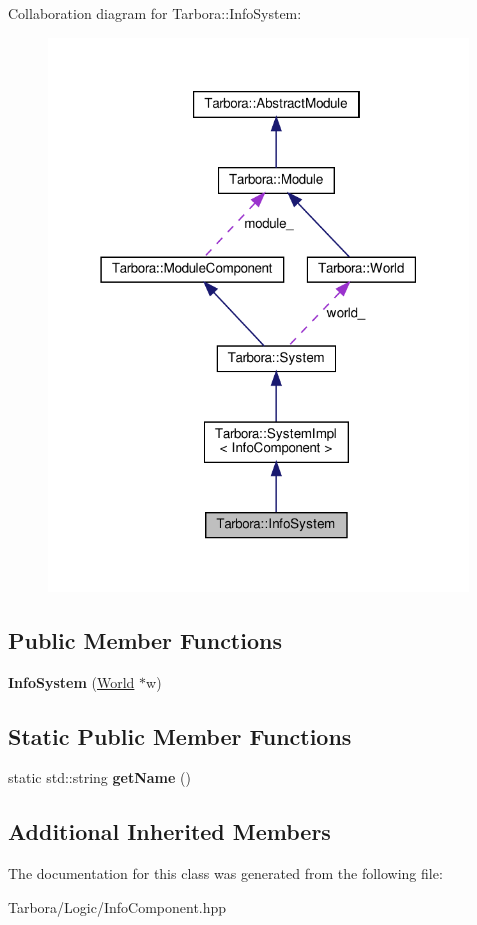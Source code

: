 Collaboration diagram for Tarbora\+:\+:Info\+System\+:\nopagebreak
\begin{figure}[H]
\begin{center}
\leavevmode
\includegraphics[width=316pt]{classTarbora_1_1InfoSystem__coll__graph}
\end{center}
\end{figure}
\subsection*{Public Member Functions}
\begin{DoxyCompactItemize}
\item 
\mbox{\label{classTarbora_1_1InfoSystem_aa51ed7d2c8080dcaec3ab3f885bb20da}} 
{\bfseries Info\+System} (\hyperlink{classTarbora_1_1World}{World} $\ast$w)
\end{DoxyCompactItemize}
\subsection*{Static Public Member Functions}
\begin{DoxyCompactItemize}
\item 
\mbox{\label{classTarbora_1_1InfoSystem_a12d888ad9d36d89e2d54b25540a6dbae}} 
static std\+::string {\bfseries get\+Name} ()
\end{DoxyCompactItemize}
\subsection*{Additional Inherited Members}


The documentation for this class was generated from the following file\+:\begin{DoxyCompactItemize}
\item 
Tarbora/\+Logic/Info\+Component.\+hpp\end{DoxyCompactItemize}

